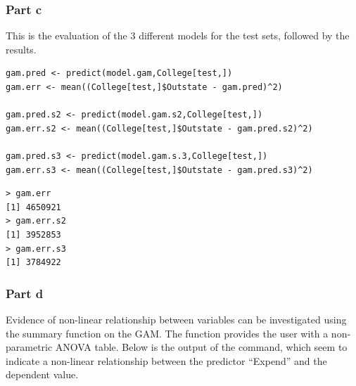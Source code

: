 \documentclass[11pt, a4paper]{article}
\begin{document}
\subsubsection{Part c}
\label{sec-1-1-3}

This is the evaluation of the 3 different models for the test sets,
followed by the results. 


\begin{verbatim}
gam.pred <- predict(model.gam,College[test,])
gam.err <- mean((College[test,]$Outstate - gam.pred)^2)

gam.pred.s2 <- predict(model.gam.s2,College[test,])
gam.err.s2 <- mean((College[test,]$Outstate - gam.pred.s2)^2)

gam.pred.s3 <- predict(model.gam.s.3,College[test,])
gam.err.s3 <- mean((College[test,]$Outstate - gam.pred.s3)^2)
\end{verbatim}


\begin{verbatim}
> gam.err
[1] 4650921
> gam.err.s2
[1] 3952853
> gam.err.s3
[1] 3784922
\end{verbatim}
\subsubsection{Part d}
\label{sec-1-1-4}

Evidence of non-linear relationship between variables can be
investigated using the summary function on the GAM. The function
provides the user with a non-parametric ANOVA table. Below is the
output of the command, which seem to indicate a non-linear
relationship between the predictor ``Expend'' and the dependent
value. 
\end{document}
